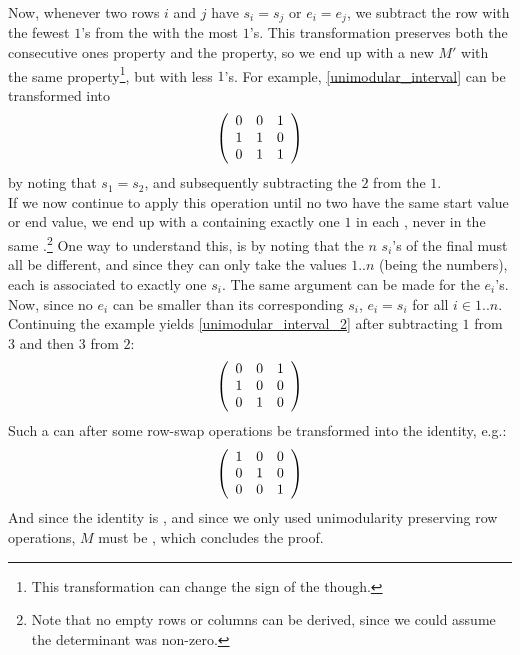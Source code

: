 \begin{exercise}
\begin{answer}
Now, whenever two rows $i$ and $j$ have $s_i=s_j$ or $e_i=e_j$, we subtract the row with the fewest $1$'s from the  with the most $1$'s. This transformation preserves both the consecutive ones property and the  property, so we end up with a new  $M'$ with the same  property\footnote{This transformation can change the sign of the  though.}, but with less $1$'s. For example,  \ref{unimodular_interval} can be transformed into
\begin{equation}
\left( \begin{array}{ccc}
0&0&1\\
1&1&0\\
0&1&1
\end{array} \right)
\end{equation}
by noting that $s_1=s_2$, and subsequently subtracting the  $2$ from the  $1$.\\
If we now continue to apply this  operation until no two  have the same start value or end value, we end up with a  containing exactly one $1$ in each , never in the same .\footnote{Note that no empty rows or columns can be derived, since we could assume the determinant was non-zero.} One way to understand this, is by noting that the $n$ $s_i$'s of the final  must all be different, and since they can only take the values $1..n$ (being the  numbers), each  is associated to exactly one $s_i$. The same argument can be made for the $e_i$'s. Now, since no $e_i$ can be smaller than its corresponding $s_i$, $e_i=s_i$ for all $i \in 1..n$. Continuing the example yields \ref{unimodular_interval_2} after subtracting  $1$ from  $3$ and then  $3$ from  $2$:
\begin{equation}
\label{unimodular_interval_2}
\left( \begin{array}{ccc}
0&0&1\\
1&0&0\\
0&1&0
\end{array} \right)
\end{equation}
Such a  can after some row-swap operations be transformed into the identity, e.g.:
\begin{equation}
\left( \begin{array}{ccc}
1&0&0\\
0&1&0\\
0&0&1
\end{array} \right)
\end{equation}
And since the identity is , and since we only used unimodularity preserving row operations, $M$ must be , which concludes the proof.
\end{answer}
\end{exercise}
